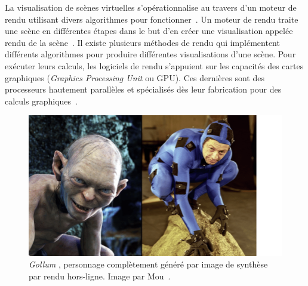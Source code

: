 La visualisation de scènes virtuelles s'opérationnalise au travers d'un moteur de rendu utilisant divers algorithmes pour fonctionner~\cite{sherman_chapter_2003}. Un moteur de rendu traite une scène en différentes étapes dans le but d'en créer une visualisation appelée rendu de la scène~\cite{pharr_physically_2023}. Il existe plusieurs méthodes de rendu qui implémentent différents algorithmes pour produire différentes visualisations d'une scène. Pour exécuter leurs calculs, les logiciels de rendu s'appuient sur les capacités des cartes graphiques (\textit{Graphics Processing Unit} ou GPU). Ces dernières sont des processeurs hautement parallèles et spécialisés dès leur fabrication pour des calculs graphiques~\cite{das_history_2016}.

\bigskip

\begin{figure}[t]
    \centering
    \includegraphics[width=.65\textwidth]{contenu/resources/images/gollum}
    \caption[\textit{Gollum} (2002), \textit{Le Seigneur des Anneaux : Les Deux Tours}]{\textit{Gollum} \protect\footnotemark, personnage complètement généré par image de synthèse par rendu hors-ligne. Image par Mou~\cite{mou_keyframe_2018}.}
    \label{fig:gollum}
\end{figure}


